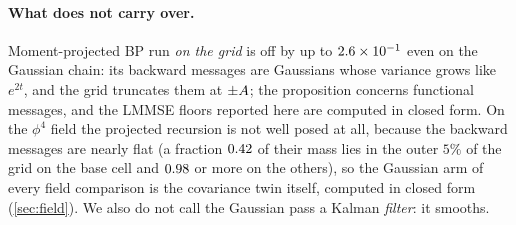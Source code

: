 \paragraph{What does not carry over.}
Moment-projected BP run \emph{on the grid} is off by up to $2.6\times10^{-1}$ even on the Gaussian chain: its
backward messages are Gaussians whose variance grows like $e^{2t}$, and the grid truncates them at
$\pm A$; the proposition concerns functional messages, and the LMMSE floors reported here are
computed in closed form. On the $\phi^4$ field the projected recursion is not well posed at all, because
the backward messages are nearly flat (a fraction $0.42$ of their mass lies in the outer
$5\%$ of the grid on the base cell and $0.98$ or more on the others), so the Gaussian
arm of every field comparison is the covariance twin itself, computed in closed form
(\cref{sec:field}). We also do not call the Gaussian pass a Kalman \emph{filter}: it smooths.
